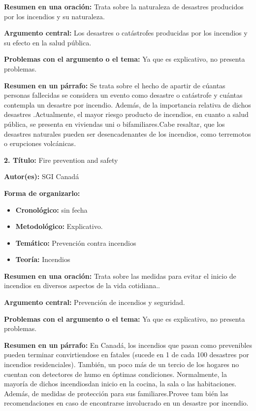 \documentclass[
  oneside]{memoir}
\begin{document}
\textbf{Resumen en una oración:} Trata sobre la naturaleza de desastres
producidos por los incendios y su naturaleza.

\textbf{Argumento central:} Los desastres o catástrofes producidas por
los incendios y su efecto en la salud pública.

\textbf{Problemas con el argumento o el tema:} Ya que es explicativo, no
presenta problemas.

\textbf{Resumen en un párrafo:} Se trata sobre el hecho de apartir de
cúantas personas fallecidas se considera un evento como desastre o
catástrofe y cuántas contempla un desastre por incendio. Además, de la
importancia relativa de dichos desastres .Actualmente, el mayor riesgo
producto de incendios, en cuanto a salud pública, se presenta en
viviendas uni o bifamiliares.Cabe resaltar, que los desastres naturales
pueden ser desencadenantes de los incendios, como terremotos o
erupciones volcánicas.

\textbf{ 2. Título:} Fire prevention and safety

\textbf{Autor(es):} SGI Canadá

\textbf{Forma de organizarlo:}

\begin{itemize}

\item \textbf{Cronológico:} sin fecha 

\item \textbf{Metodológico:} Explicativo.

\item \textbf{Temático:} Prevención contra incendios

\item \textbf{Teoría:} Incendios
\end{itemize}

\textbf{Resumen en una oración:} Trata sobre las medidas para evitar el
inicio de incendios en diversos aspectos de la vida cotidiana..

\textbf{Argumento central:} Prevención de incendios y seguridad.

\textbf{Problemas con el argumento o el tema:} Ya que es explicativo, no
presenta problemas.

\textbf{Resumen en un párrafo:} En Canadá, los incendios que pasan como
prevenibles pueden terminar convirtiendose en fatales (sucede en 1 de
cada 100 desastres por incendios residenciales). También, un poco más de
un tercio de los hogares no cuentan con detectores de humo en óptimas
condiciones. Normalmente, la mayoría de dichos incendiosdan inicio en la
cocina, la sala o las habitaciones. Además, de medidas de protección
para sus familiares.Provee tam bién las recomendaciones en caso de
encontrarse involucrado en un desastre por incendio.
\end{document}
